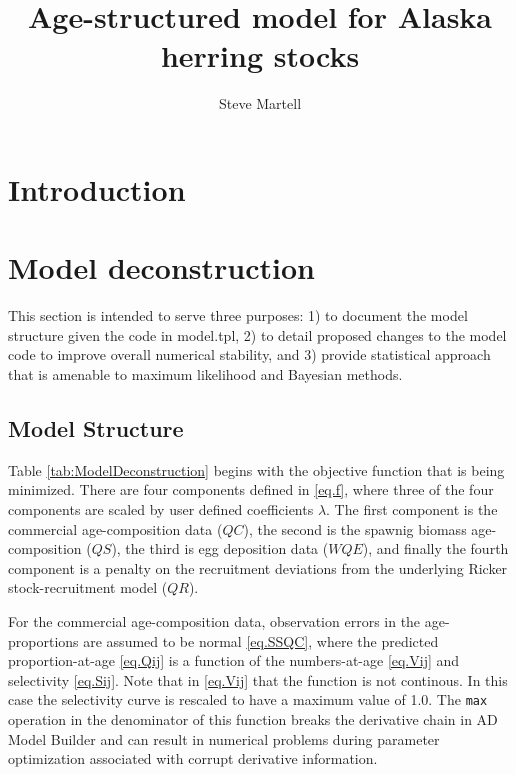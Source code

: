 \documentclass[12pt,letterpaper]{article}
\title{Age-structured model for Alaska herring stocks}
\author{Steve Martell}
\begin{document}
  \maketitle

  \begin{abstract}
    

  \end{abstract}


  \section{Introduction} %
  \label{sec:introduction}

  

  \section{Model deconstruction} %
  \label{sec:model_deconstruction}
  This section is intended to serve three purposes: 1) to document the model structure given the code in model.tpl,  2) to detail proposed changes to the model code to improve overall numerical stability, and 3) provide statistical approach that is amenable to maximum likelihood and Bayesian methods.

    \subsection{Model Structure} %
    \label{sub:model_structure}
    
    Table \ref{tab:ModelDeconstruction} begins with the objective function that is being minimized.   There are four components defined in \eqref{eq.f}, where three of the four components are scaled by user defined coefficients $\lambda$.  The first component is the commercial age-composition data ($QC$), the second is the spawnig biomass age-composition ($QS$), the third is egg deposition data ($WQE$), and finally the fourth component is a penalty on the recruitment deviations from the underlying Ricker stock-recruitment model ($QR$).

    For the commercial age-composition data, observation errors in the age-proportions are assumed to be normal \eqref{eq.SSQC}, where the predicted proportion-at-age \eqref{eq.Qij} is a function of the numbers-at-age \eqref{eq.Vij} and selectivity \eqref{eq.Sij}. Note that in \eqref{eq.Vij} that the function is not continous. In this case the selectivity curve is rescaled to have a maximum value of 1.0. The \texttt{max} operation in the denominator of this function breaks the derivative chain in AD Model Builder and can result in numerical problems during parameter optimization associated with corrupt derivative information. 
\end{document}
